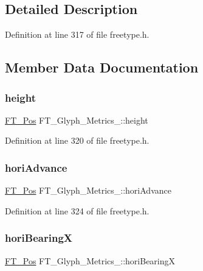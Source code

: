 \subsection{Detailed Description}


Definition at line 317 of file freetype.\+h.



\subsection{Member Data Documentation}
\mbox{\label{struct_f_t___glyph___metrics___aa2a76ec448ec9d18acf343f01b77cb21}} 
\subsubsection{\texorpdfstring{height}{height}}
{\footnotesize\ttfamily \mbox{\hyperlink{ftimage_8h_af5f230f4b253d4c7715fd2e595614c90}{F\+T\+\_\+\+Pos}} F\+T\+\_\+\+Glyph\+\_\+\+Metrics\+\_\+\+::height}



Definition at line 320 of file freetype.\+h.

\mbox{\label{struct_f_t___glyph___metrics___af12db260a90b8a7c938ad48ebf20ccbe}} 
\subsubsection{\texorpdfstring{horiAdvance}{horiAdvance}}
{\footnotesize\ttfamily \mbox{\hyperlink{ftimage_8h_af5f230f4b253d4c7715fd2e595614c90}{F\+T\+\_\+\+Pos}} F\+T\+\_\+\+Glyph\+\_\+\+Metrics\+\_\+\+::hori\+Advance}



Definition at line 324 of file freetype.\+h.

\mbox{\label{struct_f_t___glyph___metrics___a2afc877f52c8a8910ec144a1948186cc}} 
\subsubsection{\texorpdfstring{horiBearingX}{horiBearingX}}
{\footnotesize\ttfamily \mbox{\hyperlink{ftimage_8h_af5f230f4b253d4c7715fd2e595614c90}{F\+T\+\_\+\+Pos}} F\+T\+\_\+\+Glyph\+\_\+\+Metrics\+\_\+\+::hori\+BearingX}



